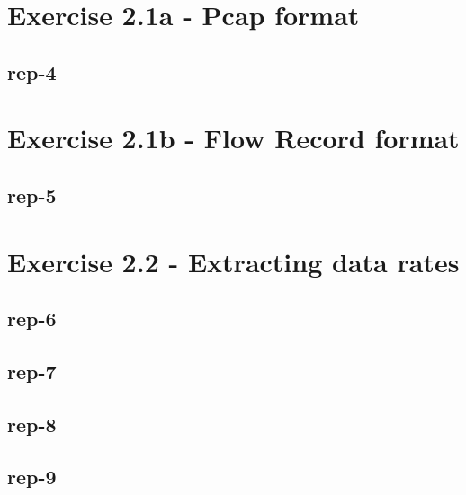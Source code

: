 \section*{Exercise 2.1a - Pcap format}
\subsection*{rep-4}

\section*{Exercise 2.1b - Flow Record format}
\subsection*{rep-5}

\section*{Exercise 2.2 - Extracting data rates}
\subsection*{rep-6}
\subsection*{rep-7}
\subsection*{rep-8}
\subsection*{rep-9}